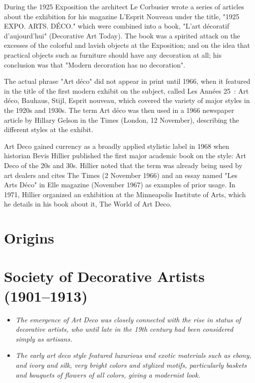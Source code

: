 During the 1925 Exposition the architect Le Corbusier wrote a series of
articles about the exhibition for his magazine L'Esprit Nouveau under
the title, "1925 EXPO. ARTS. DÉCO." which were combined into a book,
"L'art décoratif d'aujourd'hui" (Decorative Art Today). The book was a
spirited attack on the excesses of the colorful and lavish objects at
the Exposition; and on the idea that practical objects such as furniture
should have any decoration at all; his conclusion was that "Modern
decoration has no decoration".

The actual phrase "Art déco" did not appear in print until 1966, when it
featured in the title of the first modern exhibit on the subject, called
Les Années 25~: Art déco, Bauhaus, Stijl, Esprit nouveau, which covered
the variety of major styles in the 1920s and 1930s. The term Art déco
was then used in a 1966 newspaper article by Hillary Gelson in the Times
(London, 12 November), describing the different styles at the exhibit.

Art Deco gained currency as a broadly applied stylistic label in 1968
when historian Bevis Hillier published the first major academic book on
the style: Art Deco of the 20s and 30s. Hillier noted that the term was
already being used by art dealers and cites The Times (2 November 1966)
and an essay named "Les Arts Déco" in Elle magazine (November 1967) as
examples of prior usage. In 1971, Hillier organized an exhibition at the
Minneapolis Institute of Arts, which he details in his book about it,
The World of Art Deco.

\section{Origins}\label{origins}

\section{Society of Decorative Artists
(1901--1913)}\label{society-of-decorative-artists-19011913}

\begin{itemize}
\item
  \emph{The emergence of Art Deco was closely connected with the rise in
  status of decorative artists, who until late in the 19th century had
  been considered simply as artisans.}
\item
  \emph{The early art deco style featured luxurious and exotic materials
  such as ebony, and ivory and silk, very bright colors and stylized
  motifs, particularly baskets and bouquets of flowers of all colors,
  giving a modernist look.}
\end{itemize}

